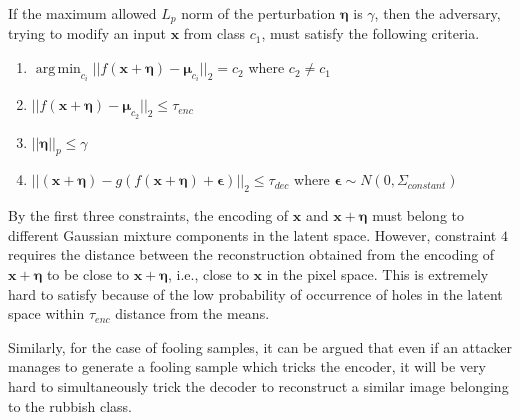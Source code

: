 \documentclass[letterpaper]{article} %
\DeclareMathOperator*{\argmin}{arg\,min}
\begin{document}
If the maximum allowed $L_{p}$ norm of the perturbation $\boldsymbol{\eta}$ is $\gamma$, then the adversary, trying to modify an input $\mathbf{x}$ from class $c_{1}$, must satisfy the following criteria.
\begin{enumerate}[leftmargin=1cm]
\setlength\itemsep{0em}
\item $\argmin_{c_i}|| f(\mathbf{x}+\boldsymbol{\eta}) - \boldsymbol{\mu}_{c_i} ||_{2} = c_{2}$ where $ c_{2}\neq c_{1}$
\item $ || f(\mathbf{x}+\boldsymbol{\eta}) - \boldsymbol{\mu}_{c_{2}} ||_{2} \leq \tau_{enc} $
\item $||\boldsymbol{\eta}||_{p} \leq \gamma$
\item $|| (\mathbf{x}+\boldsymbol{\eta}) - g(f(\mathbf{x}+\boldsymbol{\eta}) + \boldsymbol{\epsilon}) ||_{2} \leq \tau_{dec}$ where $\boldsymbol{\epsilon} \sim N(0, \Sigma_{constant})$ 
\end{enumerate}
By the first three constraints, the encoding of $\mathbf{x}$ and $\mathbf{x}+\boldsymbol{\eta}$ must belong to different Gaussian mixture components in the latent space. However, constraint $4$ requires the distance between the reconstruction obtained from the encoding of $\mathbf{x}+\boldsymbol{\eta}$ to be close to $\mathbf{x}+\boldsymbol{\eta}$, i.e., close to $\mathbf{x}$ in the pixel space. This is extremely hard to satisfy because of the low probability of occurrence of holes in the latent space within $\tau_{enc}$ distance from the means.

Similarly, for the case of fooling samples, it can be argued that even if an attacker manages to generate a fooling sample which tricks the encoder, it will be very hard to simultaneously trick the decoder to reconstruct a similar image belonging to the rubbish class.
\end{document}
